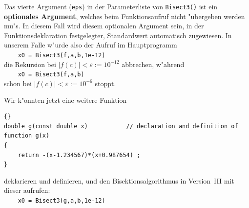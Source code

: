 


Das vierte Argument (\verb|eps|) in der Parameterliste von \verb|Bisect3()|
ist ein \textbf{optionales Argument}, welches
beim Funktionsaufruf nicht "ubergeben werden mu"s. In diesem Fall
wird diesem optionalen Argument sein, in der Funktionsdeklaration festgelegter,
Standardwert automatisch zugewiesen. In unserem Falle w"urde also der Aufruf
im Hauptprogramm
\\[0.5ex]
\verb|    x0 = Bisect3(f,a,b,1e-12)|
\\[0.5ex]
die Rekursion bei $|f(c)| < \varepsilon := 10^{-12}$ abbrechen,
w"ahrend
\\[0.5ex]
\verb|    x0 = Bisect3(f,a,b)|
\\[0.5ex]
schon bei $|f(c)| < \varepsilon := 10^{-6}$ stoppt.

Wir k"onnten jetzt eine weitere Funktion
\begin{lstlisting}[caption=Weitere globale Funktion,label=lst:7_9_5,basicstyle=\scriptsize]{}
double g(const double x)           // declaration and definition of function g(x)
{
    return -(x-1.234567)*(x+0.987654) ;
}
\end{lstlisting}
%
deklarieren und definieren, und den Bisektionsalgorithmus
in Version~III mit dieser aufrufen:
\\[0.5ex]
\verb|    x0 = Bisect3(g,a,b,1e-12)|
\\[0.5ex]

